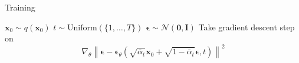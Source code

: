 \documentclass{article}
\begin{document}
    \begin{algorithm}[H]
    \caption{Training}
    \begin{algorithmic}[1]
        \REPEAT
            \STATE $ \mathbf{x}_0 \sim q(\mathbf{x}_0) $
            \STATE $ t \sim \text{Uniform}(\{1, \dots, T\}) $
            \STATE $ \boldsymbol{\epsilon} \sim \mathcal{N}(\mathbf{0}, \mathbf{I}) $
            \STATE Take gradient descent step on
            \[
            \nabla_{\theta} \left\| \boldsymbol{\epsilon} - \boldsymbol{\epsilon}_{\theta} \left( \sqrt{\bar{\alpha}_t} \mathbf{x}_0 + \sqrt{1 - \bar{\alpha}_t} \boldsymbol{\epsilon}, t \right) \right\|^2
            \]
    \end{algorithmic}
    \end{algorithm}
\end{document}
